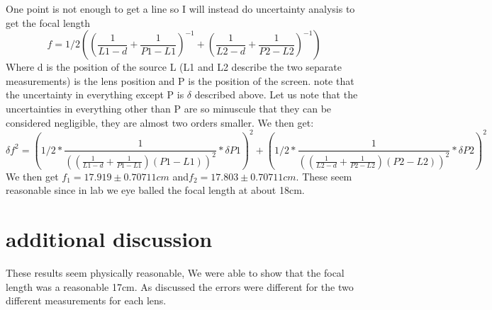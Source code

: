 \documentclass[12pt,a4paper]{article}
\begin{document}
One point is not enough to get a line so I will instead do uncertainty analysis to get the focal length 
\[f=1/2((\frac{1}{L1-d}+\frac{1}{P1-L1})^{-1}+(\frac{1}{L2-d}+\frac{1}{P2-L2})^{-1})\]
Where d is the position of the source L (L1 and L2 describe the two separate measurements) is the lens position and P is the position of the screen. note that the uncertainty in everything except P is $\delta$ described above. Let us note that the uncertainties in everything other than P are so minuscule that they can be considered negligible, they are almost two orders smaller.  We then get:
\[\delta f^2=(1/2*\frac{1}{((\frac{1}{L1-d}+\frac{1}{P1-L1})(P1-L1))^2}*\delta P1)^2+(1/2*\frac{1}{((\frac{1}{L2-d}+\frac{1}{P2-L2})(P2-L2))^2}*\delta P2)^2\]
We then get $f_1=17.919 \pm 0.70711cm$ and$f_2=17.803\pm0.70711cm$.  These seem reasonable since in lab we eye balled the focal length at about 18cm.

\section{additional discussion}
These results seem physically reasonable, We were able to show that the focal length was a reasonable 17cm.  As discussed the errors were different for the two different measurements for each lens.
\end{document}
